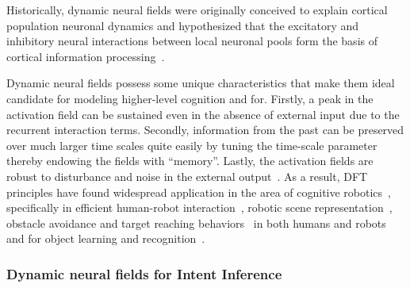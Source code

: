 Historically, dynamic neural fields were originally conceived to explain cortical population neuronal dynamics and hypothesized that the excitatory and inhibitory neural interactions between local neuronal pools form the basis of cortical information processing~\cite{wilson1973mathematical}. 

Dynamic neural fields possess some unique characteristics that make them ideal candidate for modeling higher-level cognition and for. Firstly, a peak in the activation field can be sustained even in the absence of external input due to the recurrent interaction terms. Secondly, information from the past can be preserved over much larger time scales quite easily by tuning the time-scale parameter thereby endowing the fields with ``memory''. Lastly, the activation fields are robust to disturbance and noise in the external output~\cite{schoner2008dynamical}. 
As a result, DFT principles have found widespread application in the area of cognitive robotics~\cite{erlhagen2006dynamic}, specifically in efficient human-robot interaction~\cite{erlhagen2014dynamic}, robotic scene representation~\cite{zibner2011dynamic}, obstacle avoidance and target reaching behaviors~\cite{schoner1995dynamics} in both humans and robots and for object learning and recognition~\cite{faubel2008learning}. 


\subsubsection{Dynamic neural fields for Intent Inference}\label{sssec:dft_ii}

